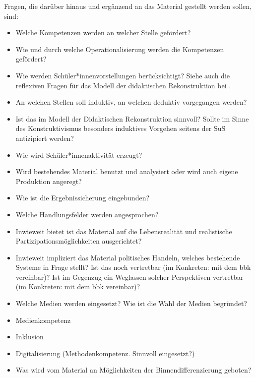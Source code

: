 Fragen, die darüber hinaus und ergänzend an das Material gestellt werden sollen, sind:
\begin{itemize}
    \item Welche Kompetenzen werden an welcher Stelle gefördert?
    \item Wie und durch welche Operationalisierung werden die Kompetenzen gefördert?
    \item Wie werden Schüler*innenvorstellungen berücksichtigt? %
    Siehe auch die reflexiven Fragen für das Modell der didaktischen Rekonstruktion bei \textcite[411-412]{Reinfried2009}.
    \item An welchen Stellen soll induktiv, an welchen deduktiv vorgegangen werden?
    \item Ist das im Modell der Didaktischen Rekonstruktion sinnvoll? \autocite[]{Reinfried2009} Sollte im Sinne des Konstruktivismus besonders induktives Vorgehen seitens der SuS antizipiert werden?
    \item Wie wird Schüler*innenaktivität erzeugt? %
    \item Wird bestehendes Material benutzt und analysiert oder wird auch eigene Produktion angeregt?
    \item Wie ist die Ergebnissicherung eingebunden?
    \item Welche Handlungsfelder werden angesprochen?
    \item Inwieweit bietet ist das Material auf die Lebensrealität und realistische Partizipationsmöglichkeiten ausgerichtet?
    \item Inwieweit impliziert das Material politisches Handeln, welches bestehende Systeme in Frage stellt? Ist das noch vertretbar (im Konkreten: mit dem \gls{bbk} vereinbar)? Ist im Gegenzug ein Weglassen solcher Perspektiven vertretbar (im Konkreten: mit dem \gls{bbk} vereinbar)?
    \item Welche Medien werden eingesetzt? Wie ist die Wahl der Medien begründet?
    \item Medienkompetenz %
    \item Inklusion
    \item Digitalisierung (Methodenkompetenz. Sinnvoll eingesetzt?)
    \item Was wird vom Material an Möglichkeiten der Binnendifferenzierung geboten?

\end{itemize}
